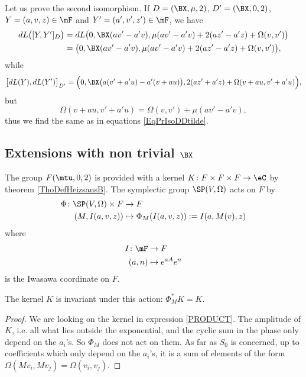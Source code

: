  Let us prove the second isomorphism. If $D=(\BX ,\mu,2)$, $D'=(\BX ,0,2)$, $Y=(a,v,z)\in\mF$ and $Y'=(a',v',z')\in \mF$, we have
\begin{equation}   \label{EqPrIsoDDtilde}
\begin{split}
   dL\big(  [Y,Y']_{D}  \big)&=dL\big(   0,\BX (av'-a'v),\mu(av'-a'v)+2(az'-a'z)+\Omega(v,v')     \big)\\
		&=\big(   0,\BX (av'-a'v),\mu(av'-a'v) +2(az'-a'z)+\Omega(v,v')  \big),
\end{split}
\end{equation}
while
\[
  \big[ dL(Y),dL(Y')   \big]_{D'}=\Big(   0,\BX \big(  a(v'+a'u)-a'(v+au)   \big),2(az'+a'z)+\Omega(v+au,v'+a'u)    \Big),
\]
but
\[
   \Omega(v+au,v'+a'u)=\Omega(v,v')+\mu(av'-a'v),
\]
thus we find the same as in equations \eqref{EqPrIsoDDtilde}.

\subsection{Extensions with non trivial \texorpdfstring{$\protect\BX $}{X}}	\label{subsecTrick}

The group $F(\mtu,0,2)$ is provided with a kernel $K\colon F\times F\times F\to \eC$ by theorem \ref{ThoDefHeizsansB}.  The symplectic group $\SP(V,\Omega)$ acts on $F$ by
\begin{equation}
\begin{aligned}
 \Phi\colon \SP(V,\Omega)\times F&\to F \\ 
(M,I(a,v,z))&\mapsto \Phi_{M}(I(a,v,z)):=I(a,M(v),z)
\end{aligned}
\end{equation}
where 
\begin{equation}
\begin{aligned}
 I\colon \mF&\to F \\ 
(a,n)&\mapsto  e^{aA} e^{n} 
\end{aligned}
\end{equation}
is the Iwasawa coordinate on $F$.

\begin{proposition}  
The kernel $K$ is invariant under this action: $\Phi^*_{M}K=K$.
 \label{PropkernelinvarSp}
\end{proposition}

\begin{proof}
We are looking on the kernel in expression \eqref{PRODUCT}. The amplitude of $K$, i.e. all what lies outside the exponential, and the cyclic sum in the phase only depend on the $a_{i}$'s. So $\Phi_{M}$ does not act on them. As far as $S_{0}$ is concerned, up to coefficients which only depend on the $a_{i}$'s, it is a sum of elements of the form $\Omega(Mv_{i},Mv_{j})=\Omega(v_{i},v_{j})$.
\end{proof}


